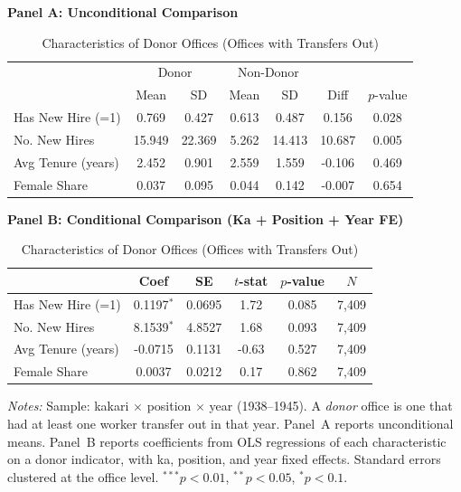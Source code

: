 \begin{table}[htbp]
\centering
\caption{Characteristics of Donor Offices (Offices with Transfers Out)}
\label{tab:donor}
\small
\begin{threeparttable}

\textbf{Panel A: Unconditional Comparison}
\medskip

\begin{tabular}{lcccccc}
\toprule
 & \multicolumn{2}{c}{Donor} & \multicolumn{2}{c}{Non-Donor} & & \\
 & Mean & SD & Mean & SD & Diff & $p$-value \\
\midrule
Has New Hire (=1) & 0.769 & 0.427 & 0.613 & 0.487 & 0.156 & 0.028 \\
No. New Hires & 15.949 & 22.369 & 5.262 & 14.413 & 10.687 & 0.005 \\
Avg Tenure (years) & 2.452 & 0.901 & 2.559 & 1.559 & -0.106 & 0.469 \\
Female Share & 0.037 & 0.095 & 0.044 & 0.142 & -0.007 & 0.654 \\
\bottomrule
\end{tabular}

\bigskip

\textbf{Panel B: Conditional Comparison (Ka + Position + Year FE)}
\medskip

\begin{tabular}{lccccc}
\toprule
 & Coef & SE & $t$-stat & $p$-value & $N$ \\
\midrule
Has New Hire (=1) & 0.1197$^{*}$ & 0.0695 & 1.72 & 0.085 & 7,409 \\
No. New Hires & 8.1539$^{*}$ & 4.8527 & 1.68 & 0.093 & 7,409 \\
Avg Tenure (years) & -0.0715 & 0.1131 & -0.63 & 0.527 & 7,409 \\
Female Share & 0.0037 & 0.0212 & 0.17 & 0.862 & 7,409 \\
\bottomrule
\end{tabular}

\begin{tablenotes}[flushleft]
\footnotesize
\item \textit{Notes:} Sample: kakari $\times$ position $\times$ year (1938--1945). A \emph{donor} office is one that had at least one worker transfer out in that year. Panel~A reports unconditional means. Panel~B reports coefficients from OLS regressions of each characteristic on a donor indicator, with ka, position, and year fixed effects. Standard errors clustered at the office level. $^{***}p<0.01$, $^{**}p<0.05$, $^{*}p<0.1$.
\end{tablenotes}
\end{threeparttable}
\end{table}
